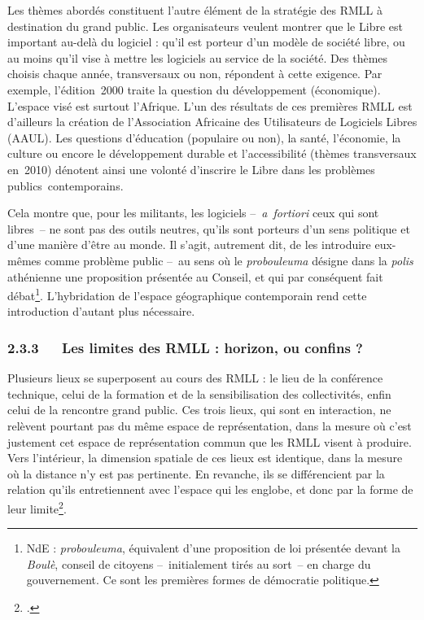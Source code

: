 \documentclass{FramateX}
\begin{document}
\begin{refsection}
Les thèmes abordés constituent l'autre élément de la stratégie des RMLL
à destination du grand public. Les organisateurs veulent montrer que le
Libre est important au-delà du logiciel : qu'il est porteur d'un modèle
de société libre, ou au moins qu'il vise à mettre les logiciels au
service de la société. Des thèmes choisis chaque année, transversaux ou
non, répondent à cette exigence. Par exemple, l'édition~2000 traite la
question du développement (économique). L'espace visé est surtout
l'Afrique. L'un des résultats de ces premières RMLL est d'ailleurs la
création de l'Association Africaine des Utilisateurs de Logiciels
Libres (AAUL). Les questions d'éducation (populaire ou non), la santé,
l'économie, la culture ou encore le développement durable et
l'accessibilité (thèmes transversaux en~2010) dénotent ainsi une
volonté d'inscrire le Libre dans les problèmes publics~contemporains.

Cela montre que, pour les militants, les logiciels –~\textit{a~fortiori}
ceux qui sont libres~– ne sont pas des outils neutres, qu'ils sont
porteurs d'un sens politique et d'une manière d'être au monde. Il
s'agit, autrement dit, de les introduire eux-mêmes comme problème
public –~au sens où le \textit{probouleuma} désigne dans la \textit{polis}
athénienne une proposition présentée au Conseil, et qui par conséquent
fait débat\footnote{NdE : \textit{probouleuma}, équivalent d'une proposition de loi présentée devant
la \textit{Boulè}, conseil de citoyens --~initialement tirés au sort~-- en charge du
gouvernement. Ce sont les premières formes de démocratie politique.}.
L'hybridation de l'espace géographique contemporain rend cette
introduction d'autant plus nécessaire.

\subsubsection*{2.3.3~~~Les limites des RMLL : horizon, ou confins ?}
{}

Plusieurs lieux se superposent au cours des RMLL : le lieu de la
conférence technique, celui de la formation et de la sensibilisation
des collectivités, enfin celui de la rencontre grand public. Ces trois
lieux, qui sont en interaction, ne relèvent pourtant pas du même espace
de représentation, dans la mesure où c'est justement cet espace de
représentation commun que les RMLL visent à produire. Vers l'intérieur,
la dimension spatiale de ces lieux est identique, dans la mesure où la
distance n'y est pas pertinente. En revanche, ils se différencient par
la relation qu'ils entretiennent avec l'espace qui les englobe, et donc
par la forme de leur
limite\footnote{\cite{retailletransformation2011}.}.


\end{refsection}
\end{document}

